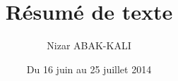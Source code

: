 \documentclass[a4paper,12pt,final]{article}
\title{Résumé de texte}
\author{Nizar ABAK-KALI}
\date{Du 16 juin au 25 juillet 2014}
\begin{document}


\cleardoublepage %

\tableofcontents
\sloppy

\cleardoublepage 



\cleardoublepage



\cleardoublepage



\cleardoublepage



\cleardoublepage



\cleardoublepage

%
\end{document}
